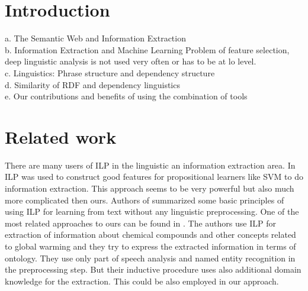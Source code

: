 \documentclass[runningheads,a4paper]{llncs}
\begin{document}
\section{Introduction}
a.	The Semantic Web and Information Extraction
\\b.	Information Extraction and Machine Learning
Problem of feature selection, deep linguistic analysis is not used very often or has to be at lo level.
\\c.	Linguistics: Phrase structure and dependency structure
\\d.	Similarity of RDF and dependency linguistics
\\e.	Our contributions and benefits of using the combination of tools




\section{Related work}
There are many users of ILP in the linguistic an information extraction area.
In \cite{Ramakrishnan:UsingILPforFeatures} ILP was used to construct good features for propositional learners like SVM to do information extraction. This approach seems to be very powerful but also much more complicated then ours. Authors of \cite{Junker99learningfor} summarized some basic principles of using ILP for learning from text without any linguistic preprocessing. One of the most related approaches to ours can be found in \cite{aitken02:_learn_infor_extrac_rules}. The authors use ILP for extraction of information about chemical compounds and other concepts related to global warming and they try to express the extracted information in terms of ontology. They use only part of speech analysis and named entity recognition in the preprocessing step. But their inductive procedure uses also additional domain knowledge for the extraction. This could be also employed in our approach.

\end{document}
